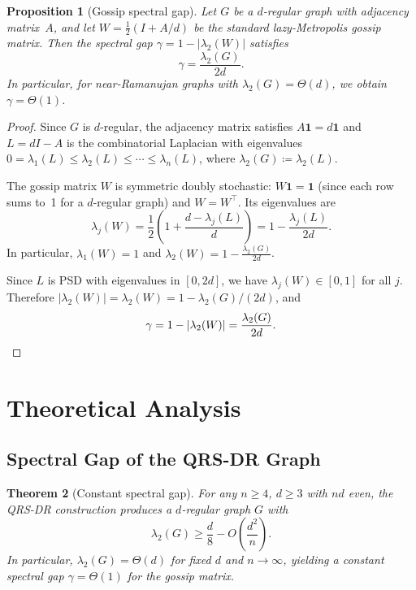 \documentclass{article}
\newtheorem{theorem}{Theorem}
\newtheorem{proposition}[theorem]{Proposition}
\newcommand{\lam}{\lambda_2}
\begin{document}
\begin{proposition}[Gossip spectral gap]
\label{prop:product_gap}
Let $G$ be a $d$-regular graph with adjacency matrix~$A$, and let
$W = \frac{1}{2}(I + A/d)$ be the standard lazy-Metropolis gossip
matrix.  Then the spectral gap $\gamma = 1 - |\lambda_2(W)|$ satisfies
\[
\gamma = \frac{\lam(G)}{2d}.
\]
In particular, for near-Ramanujan graphs with $\lam(G) = \Theta(d)$,
we obtain $\gamma = \Theta(1)$.
\end{proposition}

\begin{proof}
Since $G$ is $d$-regular, the adjacency matrix satisfies
$A\mathbf{1} = d\mathbf{1}$ and $L = dI - A$ is the combinatorial
Laplacian with eigenvalues $0 = \lambda_1(L) \le \lambda_2(L) \le
\cdots \le \lambda_n(L)$, where $\lam(G) \coloneqq \lambda_2(L)$.

The gossip matrix $W$ is symmetric doubly stochastic:
$W\mathbf{1} = \mathbf{1}$ (since each row sums to~1 for a
$d$-regular graph) and $W = W^\top$.  Its eigenvalues are
\[
\lambda_j(W) = \frac{1}{2}\!\left(1 + \frac{d - \lambda_j(L)}{d}\right)
= 1 - \frac{\lambda_j(L)}{2d}.
\]
In particular, $\lambda_1(W) = 1$ and
$\lambda_2(W) = 1 - \frac{\lam(G)}{2d}$.

Since $L$ is PSD with eigenvalues in $[0, 2d]$, we have
$\lambda_j(W) \in [0, 1]$ for all $j$.  Therefore
$|\lambda_2(W)| = \lambda_2(W) = 1 - \lam(G)/(2d)$, and
\[
\gamma = 1 - |\lambda_2(W)| = \frac{\lam(G)}{2d}.\qedhere
\]
\end{proof}


\section{Theoretical Analysis}
\label{sec:theory}

\subsection{Spectral Gap of the QRS-DR Graph}
\label{sec:spectral}

\begin{theorem}[Constant spectral gap]
\label{thm:spectral}
For any $n \ge 4$, $d \ge 3$ with $nd$ even, the QRS-DR
construction produces a $d$-regular graph $G$ with
\[
\lam(G) \ge \frac{d}{8} - O\!\left(\frac{d^2}{n}\right).
\]
In particular, $\lam(G) = \Theta(d)$ for fixed $d$ and
$n \to \infty$, yielding a constant spectral gap $\gamma = \Theta(1)$
for the gossip matrix.
\end{theorem}
\end{document}
